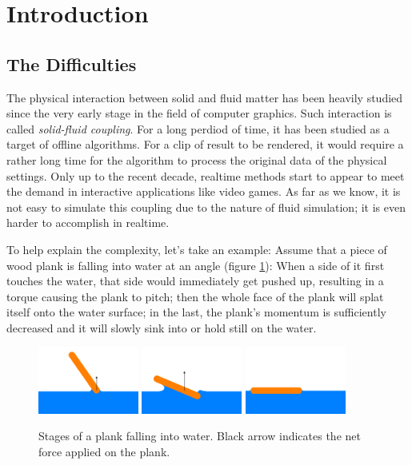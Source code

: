 \section{Introduction}

\subsection{The Difficulties}

The physical interaction between solid and fluid matter has been heavily studied since the very early stage in the field of computer graphics.
Such interaction is called \emph{solid-fluid coupling}.
For a long perdiod of time, it has been studied as a target of offline algorithms.
For a clip of result to be rendered, it would require a rather long time for the algorithm to process the original data of the physical settings.
Only up to the recent decade, realtime methods start to appear to meet the demand in interactive applications like video games\citationNeeded.
As far as we know, it is not easy to simulate this coupling due to the nature of fluid simulation;
it is even harder to accomplish in realtime.

To help explain the complexity, let's take an example:
Assume that a piece of wood plank is falling into water at an angle (figure \ref{stages-of-a-plank-falling-into-water}):
When a side of it first touches the water, that side would immediately get pushed up, resulting in a torque causing the plank to pitch;
then the whole face of the plank will splat itself onto the water surface;
in the last, the plank's momentum is sufficiently decreased and it will slowly sink into or hold still on the water.

\begin{figure}[h]
	\begin{center}
		\includegraphics[width=1.3in]{figures/stages-of-a-plank-falling-into-water/1.png}
		\includegraphics[width=1.3in]{figures/stages-of-a-plank-falling-into-water/2.png}
		\includegraphics[width=1.3in]{figures/stages-of-a-plank-falling-into-water/3.png}
	\end{center}
	\caption{
		Stages of a plank falling into water.
		Black arrow indicates the net force applied on the plank.
	}
	\label{stages-of-a-plank-falling-into-water}
\end{figure}

